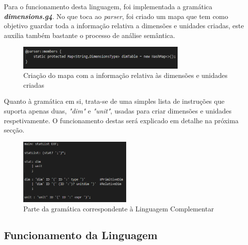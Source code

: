 \documentclass[10pt,portuguese]{article}
\begin{document}
\par Para o funcionamento desta linguagem, foi implementada a gramática \textbf{\textit{dimensions.g4}}. No que toca ao \textit{parser}, foi criado um mapa que tem como objetivo guardar toda a informação relativa a dimensões e unidades criadas, este auxilia também bastante o processo de análise semântica.
\begin{figure}[h]
\centering
\includegraphics[width=0.75\textwidth]{images/parserdimensions.png}
\caption{Criação do mapa com a informação relativa às dimensões e unidades criadas}
\end{figure}
\par Quanto à gramática em si, trata-se de uma simples lista de instruções que suporta apenas duas, \emph{"dim"} e \emph{"unit"}, usadas para criar dimensões e unidades respetivamente. O funcionamento destas será explicado em detalhe na próxima secção.
\par 
\begin{figure}[h]
\centering
\includegraphics[width=0.5\textwidth]{images/maindimensions.png}
\caption{Parte da gramática correspondente à Linguagem Complementar}
\end{figure}

\clearpage

\subsection{Funcionamento da Linguagem}
\end{document}
